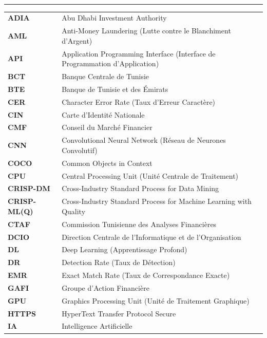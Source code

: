 \documentclass[12pt,a4paper]{report}
\newcommand{\titrespecial}[1]{%
  \noindent{\normalfont\LARGE\bfseries\color{bleu_principal} #1}\\[-0.3em]%
  \noindent\textcolor{bleu_principal}{\rule{\textwidth}{0.8pt}}%
  \vspace{1em}%
}
\begin{document}

\clearpage
\thispagestyle{fancy}
\titrespecial{Liste des Abréviations}

\renewcommand{\arraystretch}{1.4}
\begin{longtable}{@{}>{\bfseries}p{3.5cm}p{12cm}@{}}
  ADIA    & Abu Dhabi Investment Authority \\
  AML     & Anti-Money Laundering (Lutte contre le Blanchiment d'Argent) \\
  API     & Application Programming Interface (Interface de Programmation d'Application) \\
  BCT     & Banque Centrale de Tunisie \\
  BTE     & Banque de Tunisie et des Émirats \\
  CER     & Character Error Rate (Taux d'Erreur Caractère) \\
  CIN     & Carte d'Identité Nationale \\
  CMF     & Conseil du Marché Financier \\
  CNN     & Convolutional Neural Network (Réseau de Neurones Convolutif) \\
  COCO    & Common Objects in Context \\
  CPU     & Central Processing Unit (Unité Centrale de Traitement) \\
  CRISP-DM   & Cross-Industry Standard Process for Data Mining \\
  CRISP-ML(Q) & Cross-Industry Standard Process for Machine Learning with Quality \\
  CTAF    & Commission Tunisienne des Analyses Financières \\
  DCIO    & Direction Centrale de l'Informatique et de l'Organisation \\
  DL      & Deep Learning (Apprentissage Profond) \\
  DR      & Detection Rate (Taux de Détection) \\
  EMR     & Exact Match Rate (Taux de Correspondance Exacte) \\
  GAFI    & Groupe d'Action Financière \\
  GPU     & Graphics Processing Unit (Unité de Traitement Graphique) \\
  HTTPS   & HyperText Transfer Protocol Secure \\
  IA      & Intelligence Artificielle \\

\end{longtable}
\end{document}
